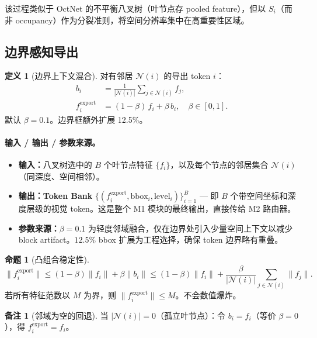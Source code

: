 \documentclass[11pt,a4paper]{article}
\theoremstyle{definition}
\newtheorem{definition}{定义}[section]
\newtheorem{proposition}{命题}[section]
\newtheorem{remark}{备注}[section]
\begin{document}
该过程类似于 OctNet 的不平衡八叉树（叶节点存 pooled feature），但以 $S_i$（而非 occupancy）作为分裂准则，将空间分辨率集中在高重要性区域。


\subsection{边界感知导出}

\begin{definition}[边界上下文混合]
对有邻居 $\mathcal{N}(i)$ 的导出 token $i$：
\begin{align}
b_i &= \frac{1}{|\mathcal{N}(i)|} \sum_{j \in \mathcal{N}(i)} f_j, \label{eq:neighbor}\\
f_i^{\mathrm{export}} &= (1 - \beta)\, f_i + \beta\, b_i, \quad \beta \in [0,1]. \label{eq:export}
\end{align}
默认 $\beta = 0.1$。边界框额外扩展 12.5\%。

\paragraph{输入 / 输出 / 参数来源。}
\begin{itemize}[nosep]
    \item \textbf{输入：}八叉树选中的 $B$ 个叶节点特征 $\{f_i\}$，以及每个节点的邻居集合 $\mathcal{N}(i)$（同深度、空间相邻）。
    \item \textbf{输出：}\textbf{Token Bank} $\{(f_i^{\mathrm{export}}, \mathrm{bbox}_i, \mathrm{level}_i)\}_{i=1}^{B}$ — 即 $B$ 个带空间坐标和深度层级的视觉 token。这是整个 M1 模块的最终输出，直接传给 M2 路由器。
    \item \textbf{参数来源：}$\beta = 0.1$ 为轻度邻域融合，仅在边界处引入少量空间上下文以减少 block artifact。$12.5\%$ bbox 扩展为工程选择，确保 token 边界略有重叠。
\end{itemize}
\end{definition}

\begin{proposition}[凸组合稳定性]
\begin{equation}
\|f_i^{\mathrm{export}}\| \leq (1-\beta)\|f_i\| + \beta\|b_i\|
\leq (1-\beta)\|f_i\| + \frac{\beta}{|\mathcal{N}(i)|}\sum_{j \in \mathcal{N}(i)} \|f_j\|.
\end{equation}
若所有特征范数以 $M$ 为界，则 $\|f_i^{\mathrm{export}}\| \leq M$。不会数值爆炸。
\end{proposition}

\begin{remark}[邻域为空的回退]
当 $|\mathcal{N}(i)|=0$（孤立叶节点）：令 $b_i = f_i$（等价 $\beta=0$），得 $f_i^{\mathrm{export}}=f_i$。
\end{remark}
\end{document}

